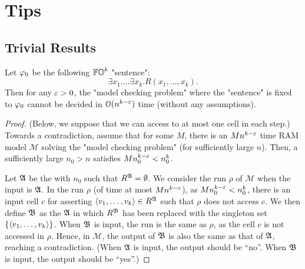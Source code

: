 
\section{Tips}

\subsection{Trivial Results}

\begin{proposition}\label{proposition: trivial lowerbound}
  Let $\fml_0$ be the following $\mathbb{FO}^{k}$ "sentence":
  \[\exists x_1. \dots \exists x_k. R(x_1, \dots, x_k).\]
  Then for any $\varepsilon > 0$,
  the "model checking problem" where the "sentence" is fixed to $\fml_0$
  cannot be decided in $\mathcal{O}(n^{k - \varepsilon})$ time (without any assumptions).
\end{proposition}
\begin{proof}
  (Below, we suppose that we can access to at most one cell in each step.)
  Towards a contradiction, 
  assume that for some $M$,
  there is an $M n^{k - \varepsilon}$ time RAM model $\mathcal{M}$ solving the "model checking problem" (for sufficiently large $n$).
  Then, a sufficiently large $n_0 > n$ satisfies $M n_0^{k - \varepsilon} < n_0^{k}$.

  Let $\struc$ be the  with $n_0$  such that $R^{\struc} = \emptyset$.
  We consider the run $\rho$ of $\mathcal{M}$ when the input is $\struc$.
  In the run $\rho$ (of time at most $M n^{k - \varepsilon}$), as $M n_0^{k - \varepsilon} < n_0^{k}$,
  there is an input cell $c$ for asserting $\tuple{v_1, \dots, v_k} \in R^{\struc}$ such that $\rho$ does not access $c$.
  We then define $\struc[2]$ as the  $\struc$ in which $R^{\struc[2]}$ has been replaced with the singleton set $\{\langle v_1, \dots, v_k\rangle\}$.
  When $\struc[2]$ is input, the run is the same as $\rho$, as the cell $c$ is not accessed in $\rho$.
  Hence, in $\mathcal{M}$, the output of $\struc[2]$ is also the same as that of $\struc$, reaching a contradiction.
  (When $\struc[1]$ is input, the output should be ``no''. When $\struc[2]$ is input, the output should be ``yes''.)
\end{proof}

\begin{yoshiki}
  \\

\end{yoshiki}

